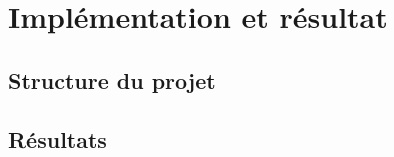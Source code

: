 
\section{Impl\'ementation et r\'esultat}

\subsection{Structure du projet}

\subsection{R\'esultats}
